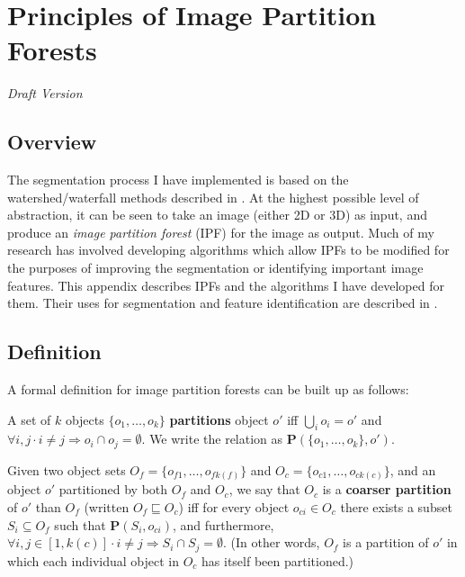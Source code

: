 \chapter{Principles of Image Partition Forests}
\label{chap:ipfs}

\emph{Draft Version}

\def\acronym#1{\mbox{\textup{\textbf{#1}}}}

\section{Overview}

The segmentation process I have implemented is based on the watershed/waterfall methods described in \cite{meijster98,marcotegui05}. At the highest possible level of abstraction, it can be seen to take an image (either 2D or 3D) as input, and produce an \emph{image partition forest} (IPF) for the image as output. Much of my research has involved developing algorithms which allow IPFs to be modified for the purposes of improving the segmentation or identifying important image features. This appendix describes IPFs and the algorithms I have developed for them. Their uses for segmentation and feature identification are described in \cite{gvccimi08,gvcispa09}.


\section{Definition}

A formal definition for image partition forests can be built up as follows:

\begin{definition}
A set of $k$ objects $\{o_1,\ldots,o_k\}$ \textbf{partitions} object $o'$ iff $\bigcup_i o_i = o'$ and $\forall i,j \cdot i \ne j \Rightarrow o_i \cap o_j = \emptyset$. We write the relation as $\mathbf{P}(\{o_1,\ldots,o_k\},o')$.
\end{definition}


\begin{definition}
Given two object sets $O_f = \{o_{f1},\ldots,o_{fk(f)}\}$ and $O_c = \{o_{c1},\ldots,o_{ck(c)}\}$, and an object $o'$ partitioned by both $O_f$ and $O_c$, we say that $O_c$ is a \textbf{coarser partition} of $o'$ than $O_f$ (written $O_f \sqsubseteq O_c$) iff for every object $o_{ci} \in O_c$ there exists a subset $S_i \subseteq O_f$ such that $\mathbf{P}(S_i, o_{ci})$, and furthermore, $\forall i,j \in [1,k(c)] \cdot i \ne j \Rightarrow S_i \cap S_j = \emptyset$. (In other words, $O_f$ is a partition of $o'$ in which each individual object in $O_c$ has itself been partitioned.)
\end{definition}

